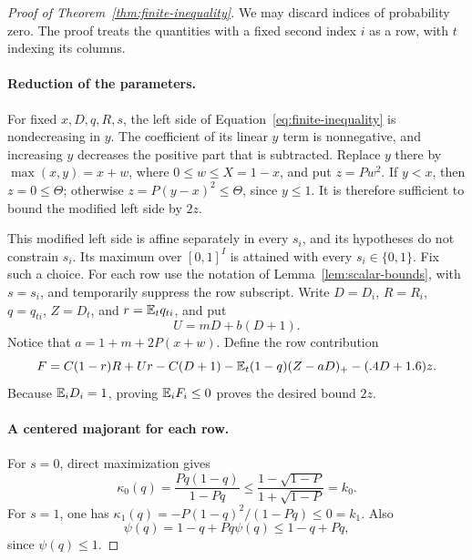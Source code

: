 \begin{proof}[Proof of Theorem~\ref{thm:finite-inequality}]
We may discard indices of probability zero.  The proof treats the
quantities with a fixed second index $i$ as a row, with $t$ indexing its
columns.

\paragraph{Reduction of the parameters.}
For fixed $x,D,q,R,s$, the left side of
Equation~\eqref{eq:finite-inequality} is nondecreasing in $y$.
The coefficient of its linear $y$ term is nonnegative, and increasing
$y$ decreases the positive part that is subtracted.  Replace $y$ there
by $\max(x,y)=x+w$, where $0\le w\le X=1-x$, and put $z=Pw^2$.
If $y<x$, then $z=0\le\Theta$; otherwise
$z=P(y-x)^2\le\Theta$, since $y\le1$.  It is therefore sufficient to
bound the modified left side by $2z$.

This modified left side is affine separately in every $s_i$, and its
hypotheses do not constrain $s_i$.  Its maximum over $[0,1]^I$ is
attained with every $s_i\in\{0,1\}$.  Fix such a choice.  For each row
use the notation of Lemma~\ref{lem:scalar-bounds}, with $s=s_i$, and
temporarily suppress the row subscript.  Write $D=D_i$, $R=R_i$,
$q=q_{ti}$, $Z=D_t$, and $r=\mathbb E_tq_{ti}$, and put
\[
 U=mD+b(D+1).
\]
Notice that $a=1+m+2P(x+w)$.  Define the row contribution
\begin{equation}
\label{eq:row-contribution}
 F=C(1-r)R+Ur-C(D+1)
       -\mathbb E_t(1-q)(Z-aD)_+-(.4D+1.6)z.
\end{equation}
Because $\mathbb E_iD_i=1$, proving $\mathbb E_iF_i\le0$ proves the desired
bound $2z$.

\paragraph{A centered majorant for each row.}
For $s=0$, direct maximization gives
\[
 \kappa_0(q)=\frac{Pq(1-q)}{1-Pq}
 \le\frac{1-\sqrt{1-P}}{1+\sqrt{1-P}}=k_0.
\]
For $s=1$, one has
$\kappa_1(q)=-P(1-q)^2/(1-Pq)\le0=k_1$.
Also
\begin{equation}
\label{eq:psi-bound}
 \psi(q)=1-q+Pq\psi(q)\le1-q+Pq,
\end{equation}
since $\psi(q)\le1$.


\end{proof}
